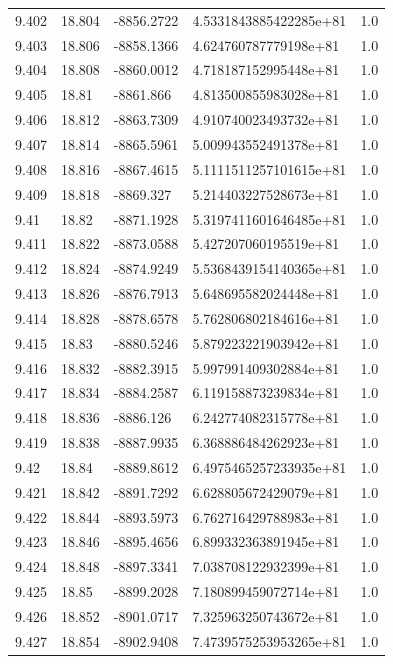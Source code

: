 \begin{tabular}{lllll}
9.402 & 18.804 & -8856.2722 & 4.5331843885422285e+81 & 1.0 \\
9.403 & 18.806 & -8858.1366 & 4.624760787779198e+81 & 1.0 \\
9.404 & 18.808 & -8860.0012 & 4.718187152995448e+81 & 1.0 \\
9.405 & 18.81 & -8861.866 & 4.813500855983028e+81 & 1.0 \\
9.406 & 18.812 & -8863.7309 & 4.910740023493732e+81 & 1.0 \\
9.407 & 18.814 & -8865.5961 & 5.009943552491378e+81 & 1.0 \\
9.408 & 18.816 & -8867.4615 & 5.1111511257101615e+81 & 1.0 \\
9.409 & 18.818 & -8869.327 & 5.214403227528673e+81 & 1.0 \\
9.41 & 18.82 & -8871.1928 & 5.3197411601646485e+81 & 1.0 \\
9.411 & 18.822 & -8873.0588 & 5.427207060195519e+81 & 1.0 \\
9.412 & 18.824 & -8874.9249 & 5.5368439154140365e+81 & 1.0 \\
9.413 & 18.826 & -8876.7913 & 5.648695582024448e+81 & 1.0 \\
9.414 & 18.828 & -8878.6578 & 5.762806802184616e+81 & 1.0 \\
9.415 & 18.83 & -8880.5246 & 5.879223221903942e+81 & 1.0 \\
9.416 & 18.832 & -8882.3915 & 5.997991409302884e+81 & 1.0 \\
9.417 & 18.834 & -8884.2587 & 6.119158873239834e+81 & 1.0 \\
9.418 & 18.836 & -8886.126 & 6.242774082315778e+81 & 1.0 \\
9.419 & 18.838 & -8887.9935 & 6.368886484262923e+81 & 1.0 \\
9.42 & 18.84 & -8889.8612 & 6.4975465257233935e+81 & 1.0 \\
9.421 & 18.842 & -8891.7292 & 6.628805672429079e+81 & 1.0 \\
9.422 & 18.844 & -8893.5973 & 6.762716429788983e+81 & 1.0 \\
9.423 & 18.846 & -8895.4656 & 6.899332363891945e+81 & 1.0 \\
9.424 & 18.848 & -8897.3341 & 7.038708122932399e+81 & 1.0 \\
9.425 & 18.85 & -8899.2028 & 7.180899459072714e+81 & 1.0 \\
9.426 & 18.852 & -8901.0717 & 7.325963250743672e+81 & 1.0 \\
9.427 & 18.854 & -8902.9408 & 7.4739575253953265e+81 & 1.0 \\

\end{tabular}
